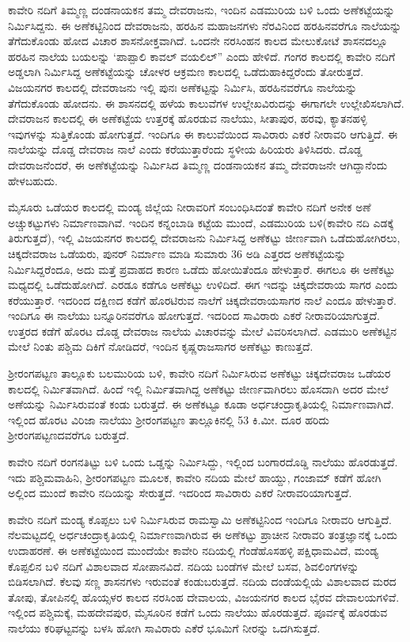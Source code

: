 ಕಾವೇರಿ ನದಿಗೆ ತಿಮ್ಮಣ್ಣ ದಂಡನಾಯಕನ ತಮ್ಮ ದೇವರಾಜನು, ಇಂದಿನ ಎಡಮುರಿಯ ಬಳಿ ಒಂದು ಅಣೆಕಟ್ಟೆಯನ್ನು ನಿರ್ಮಿಸಿದ್ದನು. ಈ ಅಣೆಕಟ್ಟಿನಿಂದ ದೇವರಾಜನು, ಹರಹಿನ ಮಹಾಜನಗಳು ನೆರವಿನಿಂದ ಹರಹಿನವರೆಗೂ ನಾಲೆಯನ್ನು ತೆಗೆದುಕೊಂಡು ಹೋದ ವಿಚಾರ ಶಾಸನೋಕ್ತವಾಗಿದೆ. ಒಂದನೇ ನರಸಿಂಹನ ಕಾಲದ ಮೇಲುಕೋಟೆ ಶಾಸನದಲ್ಲೂ ಹರಹಿನ ನಾಲೆಯ ಬಯಲನ್ನು ‘ಪಾಪ್ಪಾಲಿ ಕಾವಲ್​ ವಯಲಿಲ್​” ಎಂದು ಹೇಳಿದೆ. ಗಂಗರ ಕಾಲದಲ್ಲಿ ಕಾವೇರಿ ನದಿಗೆ ಅಡ್ಡಲಾಗಿ ನಿರ್ಮಿಸಿದ್ದ ಅಣೆಕಟ್ಟೆಯನ್ನು ಚೋಳರ ಆಕ್ರಮಣ ಕಾಲದಲ್ಲಿ ಒಡೆದುಹಾಕಿದ್ದರೆಂದು ತೋರುತ್ತದೆ. ವಿಜಯನಗರ ಕಾಲದಲ್ಲಿ ದೇವರಾಜನು ಇಲ್ಲಿ ಪುನಃ ಅಣೆಕಟ್ಟನ್ನು ನಿರ್ಮಿಸಿ, ಹರಹಿನವರೆಗೂ ನಾಲೆಯನ್ನು ತೆಗೆದುಕೊಂಡು ಹೋದನು. ಈ ಶಾಸನದಲ್ಲಿ ಹಳೆಯ ಕಾಲುವೆಗಳ ಉಲ್ಲೇಖವಿರುದನ್ನು ಈಗಾಗಲೇ ಉಲ್ಲೇಖಿಸಲಾಗಿದೆ. ದೇವರಾಜನ ಕಾಲದಲ್ಲಿ ಈ ಅಣೆಕಟ್ಟೆಯ ಉತ್ತರಕ್ಕೆ ಹೊರಡುವ ನಾಲೆಯು, ಸೀತಾಪುರ, ಹರವು, ಕ್ಯಾತನಹಳ್ಳಿ ಇವುಗಳನ್ನು ಸುತ್ತಿಕೊಂಡು ಹೋಗುತ್ತದೆ. ಇಂದಿಗೂ ಈ ಕಾಲುವೆಯಿಂದ ಸಾವಿರಾರು ಎಕರೆ ನೀರಾವರಿ ಆಗುತ್ತಿದೆ. ಈ ನಾಲೆಯನ್ನು ದೊಡ್ಡ ದೇವರಾಜ ನಾಲೆ ಎಂದು ಕರೆಯುತ್ತಾರೆಂದು ಸ್ಥಳೀಯ ಹಿರಿಯರು ತಿಳಿಸಿದರು. ದೊಡ್ಡ ದೇವರಾಜನೆಂದರೆ, ಈ ಅಣೆಕಟ್ಟೆಯನ್ನು ನಿರ್ಮಿಸಿದ ತಿಮ್ಮಣ್ಣ ದಂಡನಾಯಕನ ತಮ್ಮ ದೇವರಾಜನೇ ಆಗಿದ್ದಾನೆಂದು ಹೇಳಬಹುದು.

ಮೈಸೂರು ಒಡೆಯರ ಕಾಲದಲ್ಲಿ ಮಂಡ್ಯ ಜಿಲ್ಲೆಯ ನೀರಾವರಿಗೆ ಸಂಬಂಧಿಸಿದಂತೆ ಕಾವೇರಿ ನದಿಗೆ ಅನೇಕ ಅಣೆ ಅಚ್ಚುಕಟ್ಟುಗಳು ನಿರ್ಮಾಣವಾಗಿವೆ. ಇಂದಿನ ಕನ್ನಂಬಾಡಿ ಕಟ್ಟೆಯ ಮುಂದೆ, ಎಡಮುರಿಯ ಬಳಿ(ಕಾವೇರಿ ನದಿ ಎಡಕ್ಕೆ ತಿರುಗುತ್ತದೆ), ಇಲ್ಲಿ ವಿಜಯನಗರ ಕಾಲದಲ್ಲಿ ದೇವರಾಜನು ನಿರ್ಮಿಸಿದ್ದ ಅಣೆಕಟ್ಟು ಜೀರ್ಣವಾಗಿ ಒಡೆದುಹೋಗಿರಲು, ಚಿಕ್ಕದೇವರಾಜ ಒಡೆಯರು, ಪುನರ್​ ನಿರ್ಮಾಣ ಮಾಡಿ ಸುಮಾರು 36 ಅಡಿ ಎತ್ತರದ ಅಣೆಕಟ್ಟೆಯನ್ನು ನಿರ್ಮಿಸಿದ್ದರೆಂದೂ, ಅದು ಮತ್ತೆ ಪ್ರವಾಹದ ಕಾರಣ ಒಡೆದು ಹೋಯಿತೆಂದೂ ಹೇಳುತ್ತಾರೆ. ಈಗಲೂ ಈ ಅಣೆಕಟ್ಟು ಮಧ್ಯದಲ್ಲಿ ಒಡೆದುಹೋಗಿದೆ. ಎರಡೂ ಕಡೆಗೂ ಅಣೆಕಟ್ಟು ಉಳಿದಿದೆ. ಈಗ ಇದನ್ನು ಚಿಕ್ಕದೇವರಾಯ ಸಾಗರ ಎಂದು ಕರೆಯುತ್ತಾರೆ. ಇದರಿಂದ ದಕ್ಷಿಣದ ಕಡೆಗೆ ಹೊರಟಿರುವ ನಾಲೆಗೆ ಚಿಕ್ಕದೇವರಾಯಸಾಗರ ನಾಲೆ ಎಂದೂ ಹೇಳುತ್ತಾರೆ. ಇಂದಿಗೂ ಈ ನಾಲೆಯು ಬನ್ನೂರಿನವರೆಗೂ ಹೋಗುತ್ತದೆ. ಇದರಿಂದ ಸಾವಿರಾರು ಎಕರೆ ನೀರಾವರಿಯಾಗುತ್ತದೆ. ಉತ್ತರದ ಕಡೆಗೆ ಹೊರಟ ದೊಡ್ಡ ದೇವರಾಜ ನಾಲೆಯ ವಿಚಾರವನ್ನು ಮೇಲೆ ವಿವರಿಸಲಾಗಿದೆ. ಎಡಮುರಿ ಅಣೆಕಟ್ಟಿನ ಮೇಲೆ ನಿಂತು ಪಶ್ಚಿಮ ದಿಕಿಗೆ ನೋಡಿದರೆ, ಇಂದಿನ ಕೃಷ್ಣರಾಜಸಾಗರ ಅಣೆಕಟ್ಟು ಕಾಣುತ್ತದೆ.

ಶ‍್ರೀರಂಗಪಟ್ಟಣ ತಾಲ್ಲೂಕು ಬಲಮುರಿಯ ಬಳಿ, ಕಾವೇರಿ ನದಿಗೆ ನಿರ್ಮಿಸಿರುವ ಅಣೆಕಟ್ಟು ಚಿಕ್ಕದೇವರಾಜ ಒಡೆಯರ ಕಾಲದಲ್ಲಿ ನಿರ್ಮಿತವಾಗಿದೆ. ಹಿಂದೆ ಇಲ್ಲಿ ನಿರ್ಮಿತವಾಗಿದ್ದ ಅಣೆಕಟ್ಟು ಜೀರ್ಣವಾಗಿರಲು ಹೊಸದಾಗಿ ಅದರ ಮೇಲೆ ಅಣೆಯನ್ನು ನಿರ್ಮಿಸಿರುವಂತೆ ಕಂಡು ಬರುತ್ತದೆ. ಈ ಅಣೆಕಟ್ಟೂ ಕೂಡಾ ಅರ್ಧಚಂದ್ರಾಕೃತಿಯಲ್ಲಿ ನಿರ್ಮಾಣವಾಗಿದೆ. ಇಲ್ಲಿಂದ ಹೊರಟ ವಿರಿಜಾ ನಾಲೆಯು ಶ‍್ರೀರಂಗಪಟ್ಟಣ ತಾಲ್ಲೂಕಿನಲ್ಲಿ 53 ಕಿ.ಮೀ. ದೂರ ಹರಿದು ಶ‍್ರೀರಂಗಪಟ್ಟಣದವರೆಗೂ ಬರುತ್ತದೆ.

ಕಾವೇರಿ ನದಿಗೆ ರಂಗನತಿಟ್ಟು ಬಳಿ ಒಂದು ಒಡ್ಡನ್ನು ನಿರ್ಮಿಸಿದ್ದು, ಇಲ್ಲಿಂದ ಬಂಗಾರದೊಡ್ಡಿ ನಾಲೆಯು ಹೊರಡುತ್ತದೆ. ಇದು ಪಶ್ಚಿಮವಾಹಿನಿ, ಶ‍್ರೀರಂಗಪಟ್ಟಣ ಮೂಲಕ, ಕಾವೇರಿ ನದಿಯ ಮೇಲೆ ಹಾಯ್ದು, ಗಂಜಾಮ್ ಕಡೆಗೆ ಹೋಗಿ ಅಲ್ಲಿಂದ ಮುಂದೆ ಕಾವೇರಿ ನದಿಯನ್ನು ಸೇರುತ್ತದೆ. ಇದರಿಂದ ಸಾವಿರಾರು ಎಕರೆ ನೀರಾವರಿಯಾಗುತ್ತದೆ.

ಕಾವೇರಿ ನದಿಗೆ ಮಂಡ್ಯ ಕೊಪ್ಪಲು ಬಳಿ ನಿರ್ಮಿಸಿರುವ ರಾಮಸ್ವಾಮಿ ಅಣೆಕಟ್ಟಿನಿಂದ ಇಂದಿಗೂ ನೀರಾವರಿ ಆಗು\-ತ್ತಿದೆ. ನೆಲಮಟ್ಟದಲ್ಲಿ ಅರ್ಧಚಂದ್ರಾಕೃತಿಯಲ್ಲಿ ನಿರ್ಮಾಣವಾಗಿರುವ ಈ ಅಣೆಕಟ್ಟು ಪ್ರಾಚೀನ ನೀರಾವರಿ ತಂತ್ರಜ್ಞಾನಕ್ಕೆ ಒಂದು ಉದಾಹರಣೆ. ಈ ಅಣೆಕಟ್ಟೆಯಿಂದ ಮುಂದೆಯೇ ಕಾವೇರಿ ನದಿಯಲ್ಲಿ ಗೆಂಡೆಹೊಸಹಳ್ಳಿ ಪಕ್ಷಿಧಾಮವಿದೆ, ಮಂಡ್ಯ ಕೊಪ್ಪಲಿನ ಬಳಿ ನದಿಗೆ ವಿಶಾಲವಾದ ಸೋಪಾನವಿದೆ. ನದಿಯ ಬಂಡೆಗಳ ಮೇಲೆ ಬಸವ, ಶಿವಲಿಂಗಗಳನ್ನು ಬಿಡಿಸಲಾಗಿದೆ. ಕೆಲವು ಸಣ್ಣ ಶಾಸನಗಳು ಇರುವಂತೆ ಕಂಡುಬರುತ್ತದೆ. ನದಿಯ ದಂಡೆಯಲ್ಲಿಯೆ ವಿಶಾಲವಾದ ಮರದ ತೋಪು, ತೋಪಿನಲ್ಲಿ ಹೊಯ್ಸಳರ ಕಾಲದ ನರಸಿಂಹ ದೇವಾಲಯ, ವಿಜಯನಗರ ಕಾಲದ ಭೈರವ ದೇವಾಲಯಗಳಿವೆ. ಇಲ್ಲಿಂದ ಪಶ್ಚಿಮಕ್ಕೆ, ಮಹದೇವಪುರ, ಮೈಸೂರಿನ ಕಡೆಗೆ ಒಂದು ನಾಲೆಯು ಹೊರಡುತ್ತದೆ. ಪೂರ್ವಕ್ಕೆ ಹೊರಡುವ ನಾಲೆಯು ಕರಿಘಟ್ಟವನ್ನು ಬಳಸಿ ಹೋಗಿ ಸಾವಿರಾರು ಎಕೆರೆ ಭೂಮಿಗೆ ನೀರನ್ನು ಒದಗಿಸುತ್ತದೆ.

